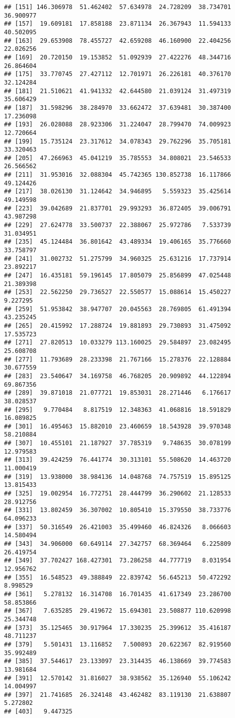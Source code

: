 \documentclass[
]{article}
\begin{document}
\begin{verbatim}
## [151] 146.306978  51.462402  57.634978  24.728209  38.734701  36.900977
## [157]  19.609181  17.858188  23.871134  26.367943  11.594133  40.502095
## [163]  29.653908  78.455727  42.659208  46.160900  22.404256  22.026256
## [169]  20.720150  19.153852  51.092939  27.422276  48.344716  26.864604
## [175]  33.770745  27.427112  12.701971  26.226181  40.376170  32.124284
## [181]  21.510621  41.941332  42.644580  21.039124  31.497319  35.606429
## [187]  31.598296  38.284970  33.662472  37.639481  30.387400  17.236098
## [193]  26.028088  28.923306  31.224047  28.799470  74.009923  12.720664
## [199]  15.735124  23.317612  34.078343  29.762296  35.705181  33.320463
## [205]  47.266963  45.041219  35.785553  34.808021  23.546533  26.566562
## [211]  31.953016  32.088304  45.742365 130.852738  16.117866  49.124426
## [217]  38.026130  31.124642  34.946895   5.559323  35.425614  49.149598
## [223]  39.042689  21.837701  29.993293  36.872405  39.006791  43.987298
## [229]  27.624778  33.500737  22.388067  25.972786   7.533739  31.034951
## [235]  45.124484  36.801642  43.489334  19.406165  35.776660  33.758797
## [241]  31.002732  51.275799  34.960325  25.631216  17.737914  23.892217
## [247]  16.435181  59.196145  17.805079  25.856899  47.025448  21.389398
## [253]  22.562250  29.736527  22.550577  15.088614  15.450227   9.227295
## [259]  51.953842  38.947707  20.045563  28.769805  61.491394  43.235245
## [265]  20.415992  17.288724  19.881893  29.730893  31.475092  17.535723
## [271]  27.820513  10.033279 113.160025  29.584897  23.082495  25.608708
## [277]  11.793689  28.233398  21.767166  15.278376  22.128884  30.677559
## [283]  23.540647  34.169758  46.768205  20.909892  44.122894  69.867356
## [289]  39.871018  21.077721  19.853031  28.271446   6.176617  38.028537
## [295]   9.770484   8.817519  12.348363  41.068816  18.591829  16.089825
## [301]  16.495463  15.882010  23.460659  18.543928  39.970348  58.210884
## [307]  10.455101  21.187927  37.785319   9.748635  30.078199  12.979583
## [313]  39.424259  76.441774  30.313101  55.508620  14.463720  11.000419
## [319]  13.938000  38.984136  14.048768  74.757519  15.895125  13.815433
## [325]  19.002954  16.772751  28.444799  36.290602  21.128533  28.912756
## [331]  13.802459  36.307002  10.805410  15.379550  38.733776  64.096233
## [337]  50.316549  26.421003  35.499460  46.824326   8.066603  14.580494
## [343]  34.906000  60.649114  27.342757  68.369464   6.225809  26.419754
## [349]  37.702427 168.427301  73.286258  44.777719   8.031954  12.956762
## [355]  16.548523  49.388849  22.839742  56.645213  50.472292   8.998529
## [361]   5.278132  16.314708  16.701435  41.617349  23.286700  58.853866
## [367]   7.635285  29.419672  15.694301  23.508877 110.620998  25.344748
## [373]  35.125465  30.917964  17.330235  25.399612  35.416187  48.711237
## [379]   5.501431  13.116852   7.500893  20.622367  82.919560  35.992489
## [385]  37.544617  23.133097  23.314435  46.138669  39.774583  13.981684
## [391]  12.570142  31.816027  38.938562  35.126940  55.106242  14.004997
## [397]  21.741685  26.324148  43.462482  83.119130  21.638807   5.272802
## [403]   9.447325
\end{verbatim}
\end{document}
